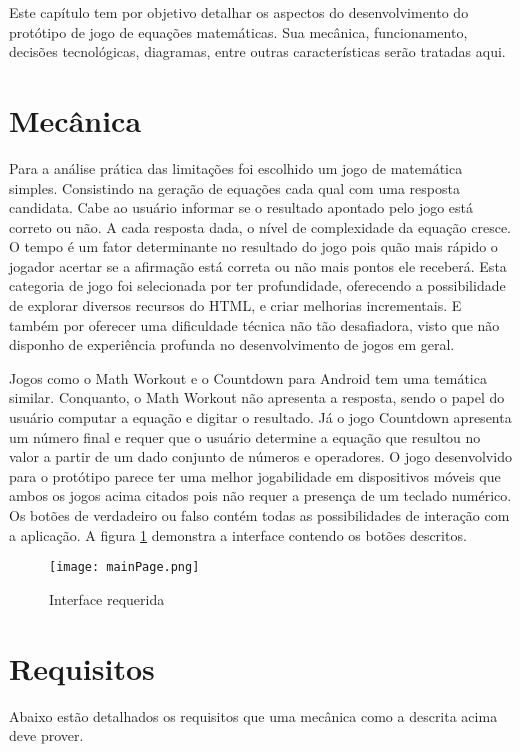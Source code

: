Este capítulo tem por objetivo detalhar os aspectos do desenvolvimento
do protótipo de jogo de equações matemáticas. Sua mecânica, funcionamento, decisões tecnológicas,
diagramas, entre outras características serão tratadas aqui.

\section{Mecânica}

Para a análise prática das limitações foi escolhido um jogo de
matemática simples. Consistindo na geração de equações cada qual 
com uma resposta candidata. Cabe ao usuário informar se o resultado apontado
pelo jogo está correto ou não. A cada resposta dada, o nível de
complexidade da equação cresce. O tempo é um fator determinante
no resultado do jogo pois quão mais rápido o jogador acertar se a
afirmação está correta ou não mais pontos ele receberá. Esta
categoria de jogo foi selecionada por ter profundidade, oferecendo a
possibilidade de explorar diversos recursos do HTML, e criar melhorias
incrementais. E também por oferecer uma dificuldade técnica não
tão desafiadora, visto que não disponho de experiência profunda no
desenvolvimento de jogos em geral.

Jogos como o Math Workout e o Countdown para Android tem uma temática
similar. Conquanto, o Math Workout não apresenta a resposta, sendo o
papel do usuário computar a equação e digitar o resultado. Já o jogo
Countdown apresenta um número final e requer que o usuário determine
a equação que resultou no valor a partir de um dado conjunto de
números e operadores. O jogo desenvolvido para o protótipo parece ter
uma melhor jogabilidade em dispositivos móveis que ambos os jogos acima
citados pois não requer a presença de um teclado numérico. Os botões
de verdadeiro ou falso contém todas as possibilidades de interação
com a aplicação. A figura \ref{fig:sketch} demonstra a interface
contendo os botões descritos.

\begin{figure}[H]
    \centering
    \texttt{[image: mainPage.png]}
	\caption{Interface requerida}
    \label{fig:sketch}
\end{figure}



\section{Requisitos}

Abaixo estão detalhados os requisitos que uma mecânica como a descrita
acima deve prover.

